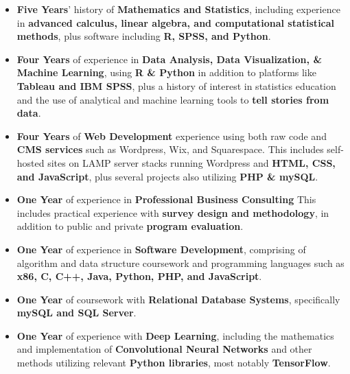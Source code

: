 \documentclass[8pt,a4paper,ragged2e,withhyper]{altacv}
\begin{document}
\begin{changemargin}{0.5cm}{0.7cm}
\begin{itemize}
    \item \textbf{\color{accent}Five Years}' history of \textbf{\color{accent}Mathematics and Statistics}, including experience in \textbf{advanced calculus, linear algebra, and computational statistical methods}, plus software including \textbf{R, SPSS, and Python}.
    \item \textbf{\color{accent}Four Years} of experience in \textbf{\color{accent}Data Analysis, Data Visualization, \& Machine Learning}, using \textbf{R \& Python} in addition to platforms like \textbf{Tableau and IBM SPSS}, plus a history of interest in statistics education and the use of analytical and machine learning tools to \textbf{tell stories from data}.
    \item \textbf{\color{accent}Four Years} of \textbf{\color{accent}Web Development} experience using both raw code and \textbf{CMS services} such as Wordpress, Wix, and Squarespace. This includes self-hosted sites on LAMP server stacks running Wordpress and \textbf{HTML, CSS, and JavaScript}, plus several projects also utilizing \textbf{PHP \& mySQL}.

    \item \textbf{\color{accent}One Year} of experience in \textbf{\color{accent}Professional Business Consulting} This includes practical experience with \textbf{survey design and methodology}, in addition to public and private \textbf{program evaluation}.
    \item \textbf{\color{accent}One Year} of experience in \textbf{\color{accent}Software Development}, comprising of algorithm and data structure coursework and programming languages such as \textbf{x86, C, C++, Java, Python, PHP, and JavaScript}.
    \item \textbf{\color{accent}One Year} of coursework with \textbf{\color{accent}Relational Database Systems}, specifically \textbf{mySQL and SQL Server}.
    \item \textbf{\color{accent}One Year} of experience with \textbf{\color{accent}Deep Learning}, including the mathematics and implementation of \textbf{Convolutional Neural Networks} and other methods utilizing relevant \textbf{Python libraries}, most notably \textbf{TensorFlow}.
\end{itemize}


\end{changemargin}
\end{document}
